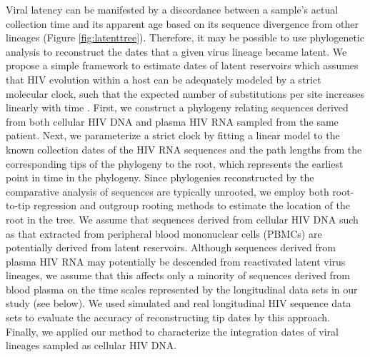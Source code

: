 \documentclass[12pt]{article}
\begin{document}
Viral latency can be manifested by a discordance between a sample's actual collection time and its apparent age based on its sequence divergence from other lineages (Figure \ref{fig:latenttree}). 
Therefore, it may be possible to use phylogenetic analysis to reconstruct the dates that a given virus lineage became latent.
We propose a simple framework to estimate dates of latent reservoirs which assumes that HIV evolution within a host can be adequately modeled by a strict molecular clock, such that the expected number of substitutions per site increases linearly with time \citep{Ho14}. 
First, we construct a phylogeny relating sequences derived from both cellular HIV DNA and plasma HIV RNA sampled from the same patient.
Next, we parameterize a strict clock by fitting a linear model to the known collection dates of the HIV RNA sequences and the path lengths from the corresponding tips of the phylogeny to the root, which represents the earliest point in time in the phylogeny. 
Since phylogenies reconstructed by the comparative analysis of sequences are typically unrooted, we employ both root-to-tip regression \citep{Korber00} and outgroup rooting methods to estimate the location of the root in the tree. 
We assume that sequences derived from cellular HIV DNA such as that extracted from peripheral blood mononuclear cells (PBMCs) are potentially derived from latent reservoirs. %
Although sequences derived from plasma HIV RNA may potentially be descended from reactivated latent virus lineages, we assume that this affects only a minority of sequences derived from blood plasma on the time scales represented by the longitudinal data sets in our study (see below).
We used simulated and real longitudinal HIV sequence data sets to evaluate the accuracy of reconstructing tip dates by this approach.
Finally, we applied our method to characterize the integration dates of viral lineages sampled as cellular HIV DNA.

%
\end{document}
